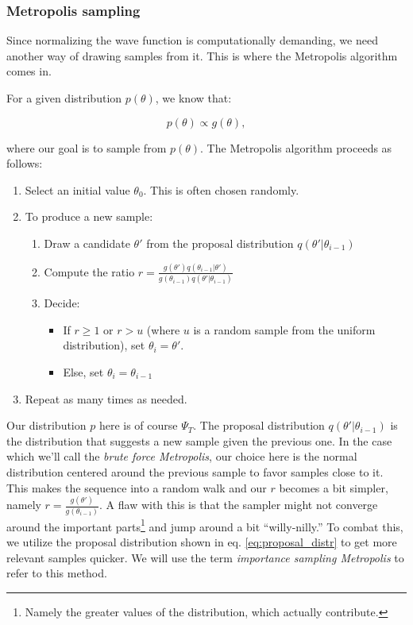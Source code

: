 \documentclass[
]{article}
\providecommand{\tightlist}{%
  \setlength{\itemsep}{0pt}\setlength{\parskip}{0pt}}
\begin{document}
\hypertarget{metropolis-sampling}{%
\subsubsection*{Metropolis sampling}\label{metropolis-sampling}}

Since normalizing the wave function is computationally demanding, we
need another way of drawing samples from it. This is where the
Metropolis algorithm comes in.

For a given distribution \(p(\theta)\), we know that:

\[p(\theta) \propto g(\theta),\]

where our goal is to sample from \(p(\theta)\). The Metropolis algorithm
proceeds as follows:

\begin{enumerate}
\def\labelenumi{\arabic{enumi}.}
\tightlist
\item
  Select an initial value \(\theta_0\). This is often chosen randomly.
\item
  To produce a new sample:

  \begin{enumerate}
  \def\labelenumii{\arabic{enumii}.}
  \tightlist
  \item
    Draw a candidate \(\theta'\) from the proposal distribution
    \(q(\theta'|\theta_{i-1})\)
  \item
    Compute the ratio
    \(r = \frac{g(\theta')q(\theta_{i-1}|\theta')}{g(\theta_{i-1})q(\theta'|\theta_{i-1})}\)
  \item
    Decide:

    \begin{itemize}
    \tightlist
    \item
      If \(r \ge 1\) or \(r > u\) (where \(u\) is a random sample from
      the uniform distribution), set \(\theta_{i} = \theta'\).
    \item
      Else, set \(\theta_{i} = \theta_{i-1}\)
    \end{itemize}
  \end{enumerate}
\item
  Repeat as many times as needed.
\end{enumerate}

Our distribution \(p\) here is of course \(\Psi_T\). The proposal
distribution \(q(\theta'|\theta_{i-1})\) is the distribution that
suggests a new sample given the previous one. In the case which we'll
call the \emph{brute force Metropolis}, our choice here is the normal
distribution centered around the previous sample to favor samples close
to it. This makes the sequence into a random walk and our \(r\) becomes
a bit simpler, namely \(r = \frac{g(\theta')}{g(\theta_{i-1})}\). A flaw
with this is that the sampler might not converge around the important
parts\footnote{Namely the greater values of the distribution, which
  actually contribute.} and jump around a bit ``willy-nilly.'' To combat
this, we utilize the proposal distribution shown in eq.
\eqref{eq:proposal_distr} to get more relevant samples quicker. We will
use the term \emph{importance sampling Metropolis} to refer to this
method.
\end{document}

